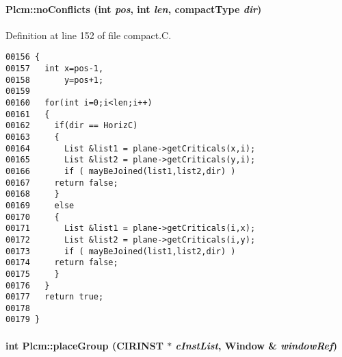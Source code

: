\paragraph{ Plcm::no\-Conflicts (int {\em pos}, int {\em len}, {\bf compact\-Type} {\em dir})\hspace{0.3cm}{\tt  [private]}}\hfill



Definition at line 152 of file compact.C.\small\begin{verbatim}00156 {
00157   int x=pos-1,
00158       y=pos+1;
00159 
00160   for(int i=0;i<len;i++)
00161   {
00162     if(dir == HorizC)
00163     {
00164       List &list1 = plane->getCriticals(x,i);
00165       List &list2 = plane->getCriticals(y,i);
00166       if ( mayBeJoined(list1,list2,dir) )
00167     return false;
00168     }
00169     else
00170     {
00171       List &list1 = plane->getCriticals(i,x);
00172       List &list2 = plane->getCriticals(i,y);
00173       if ( mayBeJoined(list1,list2,dir) )
00174     return false;
00175     }
00176   }
00177   return true;
00178 
00179 }
\end{verbatim}\normalsize 
\label{Plcm_c9}
\paragraph{\setlength{\rightskip}{0pt plus 5cm}int Plcm::place\-Group (CIRINST $\ast$ {\em c\-Inst\-List}, {\bf Window} \& {\em window\-Ref})\hspace{0.3cm}{\tt  [private]}}\hfill




